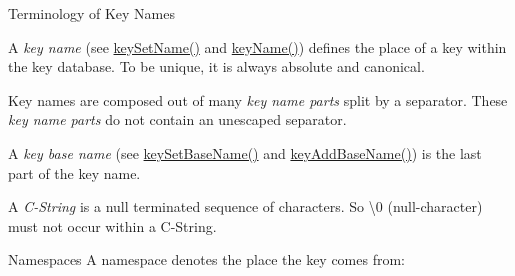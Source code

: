 \begin{DoxyParagraph}{Terminology of Key Names}

\begin{DoxyItemize}
\item A {\itshape key name} (see \hyperlink{group__keyname_ga7699091610e7f3f43d2949514a4b35d9}{key\+Set\+Name()} and \hyperlink{group__keyname_ga8e805c726a60da921d3736cda7813513}{key\+Name()}) defines the place of a key within the key database. To be unique, it is always absolute and canonical.
\item Key names are composed out of many {\itshape key name parts} split by a separator. These {\itshape key name parts} do not contain an unescaped separator.
\item A {\itshape key base name} (see \hyperlink{group__keyname_ga6e804bd453f98c28b0ff51430d1df407}{key\+Set\+Base\+Name()} and \hyperlink{group__keyname_gaa942091fc4bd5c2699e49ddc50829524}{key\+Add\+Base\+Name()}) is the last part of the key name.
\item A {\itshape C-\/\+String} is a null terminated sequence of characters. So \textbackslash{}0 (null-\/character) must not occur within a C-\/\+String.
\end{DoxyItemize}
\end{DoxyParagraph}
\begin{DoxyParagraph}{Namespaces}
A namespace denotes the place the key comes from\+:
\end{DoxyParagraph}


